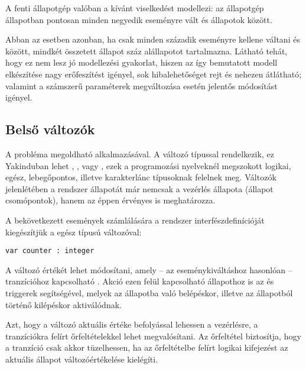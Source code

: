
A fenti állapotgép valóban a kívánt viselkedést modellezi: az állapotgép  állapotban pontosan minden negyedik  eseményre vált  és  állapotok között.

Abban az esetben azonban, ha csak minden századik eseményre kellene váltani  és  között, mindkét összetett állapot száz alállapotot tartalmazna. Látható tehát, hogy ez nem lesz jó modellezési gyakorlat, hiszen az így bemutatott modell elkészítése nagy erőfeszítést igényel, sok hibalehetőséget rejt és nehezen átlátható; valamint a számszerű paraméterek megváltozása esetén jelentős módosítást igényel.

\subsection{Belső változók}

A probléma megoldható  alkalmazásával. A változó típussal rendelkezik, ez Yakinduban lehet , ,  vagy , ezek a programozási nyelveknél megszokott logikai, egész, lebegőpontos, illetve karakterlánc típusoknak felelnek meg. Változók jelenlétében a rendszer állapotát már nemcsak a vezérlés állapota (állapot csomópontok), hanem az éppen érvényes  is meghatározza.

\begin{megjegyzes}
A bekövetkezett  események számlálására a rendszer interfészdefinícióját kiegészítjük a  egész típusú változóval:

\begin{lstlisting}
var counter : integer
\end{lstlisting}
\end{megjegyzes}

A változó értékét  lehet módosítani, amely -- az eseménykiváltáshoz hasonlóan -- tranzícióhoz kapcsolható . Akció ezen felül kapcsolható állapothoz is az  és  triggerek segítségével, melyek az állapotba való belépéskor, illetve az állapotból történő kilépéskor aktiválódnak.

Azt, hogy a változó aktuális értéke befolyással lehessen a vezérlésre, a tranzíciókra felírt őrfeltételekkel lehet megvalósítani. Az őrfeltétel biztosítja, hogy a tranzíció csak akkor tüzelhessen, ha az őrfeltételbe felírt logikai kifejezést az aktuális állapot változóértékelése kielégíti.

